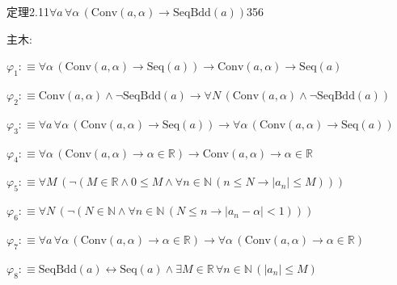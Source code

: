 \begin{fullproof}{定理2.11}{$\forall a\,\forall \alpha\,(\mathrm{Conv}(a,\alpha) \to \mathrm{SeqBdd}(a))$}{356}
\begin{ptree}
\noLine
{}
\end{ptree}
\noindent 主木:
\begin{ptree}
\noLine
{}
\noLine
{}
\end{ptree}
\begin{abbrevlist}
\item $\varphi_{1} :\equiv \forall \alpha\,(\mathrm{Conv}(a,\alpha) \to \mathrm{Seq}(a)) \to \mathrm{Conv}(a,\alpha) \to \mathrm{Seq}(a)$
\item $\varphi_{2} :\equiv \mathrm{Conv}(a,\alpha) \land \neg \mathrm{SeqBdd}(a) \to \forall N\,(\mathrm{Conv}(a,\alpha) \land \neg \mathrm{SeqBdd}(a))$
\item $\varphi_{3} :\equiv \forall a\,\forall \alpha\,(\mathrm{Conv}(a,\alpha) \to \mathrm{Seq}(a)) \to \forall \alpha\,(\mathrm{Conv}(a,\alpha) \to \mathrm{Seq}(a))$
\item $\varphi_{4} :\equiv \forall \alpha\,(\mathrm{Conv}(a,\alpha) \to \alpha \in \mathbb{R}) \to \mathrm{Conv}(a,\alpha) \to \alpha \in \mathbb{R}$
\item $\varphi_{5} :\equiv \forall M\,(\neg (M \in \mathbb{R} \land 0 \leq M \land \forall n \in \mathbb{N}\,(n \leq N \to \lvert a_{n} \rvert \leq M)))$
\item $\varphi_{6} :\equiv \forall N\,(\neg (N \in \mathbb{N} \land \forall n \in \mathbb{N}\,(N \leq n \to \lvert a_{n} - \alpha \rvert < 1)))$
\item $\varphi_{7} :\equiv \forall a\,\forall \alpha\,(\mathrm{Conv}(a,\alpha) \to \alpha \in \mathbb{R}) \to \forall \alpha\,(\mathrm{Conv}(a,\alpha) \to \alpha \in \mathbb{R})$
\item $\varphi_{8} :\equiv \mathrm{SeqBdd}(a) \leftrightarrow \mathrm{Seq}(a) \land \exists M \in \mathbb{R}\,\forall n \in \mathbb{N}\,(\lvert a_{n} \rvert \leq M)$

\end{abbrevlist}
\end{fullproof}
